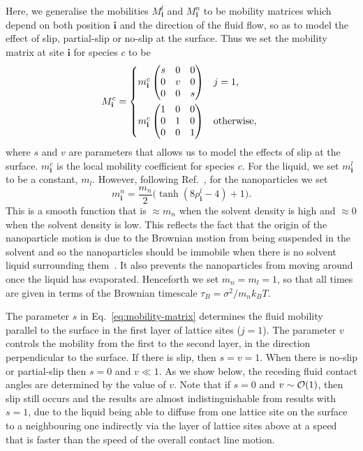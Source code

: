 \documentclass[journal=langd5,manuscript=article]{achemso}
\def\i{\mathbf{i}}
\begin{document}
Here, we generalise the mobilities $M^l_\i$ and $M^n_\i$ to be mobility
matrices which depend on both position $\i$ and the direction of the
fluid flow, so as to model the effect of slip, partial-slip or no-slip
at the surface. Thus we set the mobility matrix at site $\i$ for species
$c$ to be
%
\begin{equation}
  M^c_\i =
  \begin{cases*}
    m^c_\i
    \begin{pmatrix}
      s & 0 & 0 \\
      0 & v & 0 \\
      0 & 0 & s
    \end{pmatrix}
      & $j=1$,\\
    m^c_\i
    \begin{pmatrix}
      1 & 0 & 0 \\
      0 & 1 & 0 \\
      0 & 0 & 1
    \end{pmatrix}
      & otherwise,
  \end{cases*}
\label{eq:mobility-matrix}
\end{equation}
%
where $s$ and $v$ are parameters that allows us to model the effects of slip at
the surface.
$m^c_\i$ is the local mobility coefficient for species $c$. For the liquid, we set $m^l_\i$ to be a constant, $m_l$. However, following Ref.~, for the nanoparticles we set
%
\begin{equation}
  m^n_\i = \frac{m_n}2 \bigl( \tanh ( 8\rho^l_\i - 4 ) + 1 \bigr).
  \label{eq:mob_nano}
\end{equation}
%
This is a smooth function that is $\approx m_n$ when the solvent density is
high and $\approx 0$ when the solvent density is low. This reflects the
fact that the origin of the nanoparticle motion is due to the Brownian
motion from being suspended in the solvent and so the nanoparticles
should be immobile when there is no solvent liquid surrounding
them~\cite{chalmers2017,robbins2011}. It also prevents the nanoparticles
from moving around once the liquid has evaporated. Henceforth we set
$m_n = m_l = 1$, so that all times are given in terms of the Brownian
timescale $\tau_B = \sigma^2/m_nk_BT$.

The parameter $s$ in Eq.~\eqref{eq:mobility-matrix} determines the fluid
mobility parallel to the surface in the first layer of lattice sites
($j=1$). The parameter $v$ controls the mobility
from the first to the second layer, in the direction perpendicular to
the surface. If there is slip, then $s=v=1$. When there is no-slip or
partial-slip then $s=0$ and $v \ll 1$. As we show below, the
receding fluid contact angles are determined by the value of $v$.
{Note that if $s=0$ and $v\sim {\cal O}(1)$, then slip still occurs and the results are almost indistinguishable from results with $s=1$, due to the liquid being able to diffuse from one lattice site on the surface to a neighbouring one indirectly via the layer of lattice sites above at a speed that is faster than the speed of the overall contact line motion.}
\end{document}
